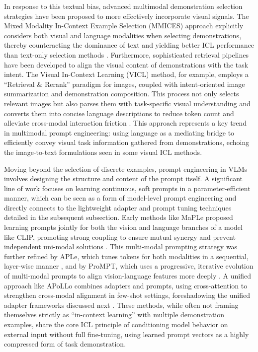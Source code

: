 \documentclass[11pt]{article}
\begin{document}
In response to this textual bias, advanced multimodal demonstration selection strategies have been proposed to more effectively incorporate visual signals. The Mixed Modality In-Context Example Selection (MMICES) approach explicitly considers both visual and language modalities when selecting demonstrations, thereby counteracting the dominance of text and yielding better ICL performance than text-only selection methods \cite{ref221}. Furthermore, sophisticated retrieval pipelines have been developed to align the visual content of demonstrations with the task intent. The Visual In-Context Learning (VICL) method, for example, employs a ``Retrieval \& Rerank'' paradigm for images, coupled with intent-oriented image summarization and demonstration composition. This process not only selects relevant images but also parses them with task-specific visual understanding and converts them into concise language descriptions to reduce token count and alleviate cross-modal interaction friction \cite{ref236}. This approach represents a key trend in multimodal prompt engineering: using language as a mediating bridge to efficiently convey visual task information gathered from demonstrations, echoing the image-to-text formulations seen in some visual ICL methods.

Moving beyond the selection of discrete examples, prompt engineering in VLMs involves designing the structure and content of the prompt itself. A significant line of work focuses on learning continuous, soft prompts in a parameter-efficient manner, which can be seen as a form of model-level prompt engineering and directly connects to the lightweight adapter and prompt tuning techniques detailed in the subsequent subsection. Early methods like MaPLe proposed learning prompts jointly for both the vision and language branches of a model like CLIP, promoting strong coupling to ensure mutual synergy and prevent independent uni-modal solutions \cite{ref237}. This multi-modal prompting strategy was further refined by APLe, which tunes tokens for both modalities in a sequential, layer-wise manner \cite{ref238}, and by ProMPT, which uses a progressive, iterative evolution of multi-modal prompts to align vision-language features more deeply \cite{ref239}. A unified approach like APoLLo combines adapters and prompts, using cross-attention to strengthen cross-modal alignment in few-shot settings, foreshadowing the unified adapter frameworks discussed next \cite{ref240}. These methods, while often not framing themselves strictly as ``in-context learning'' with multiple demonstration examples, share the core ICL principle of conditioning model behavior on external input without full fine-tuning, using learned prompt vectors as a highly compressed form of task demonstration.
\end{document}

